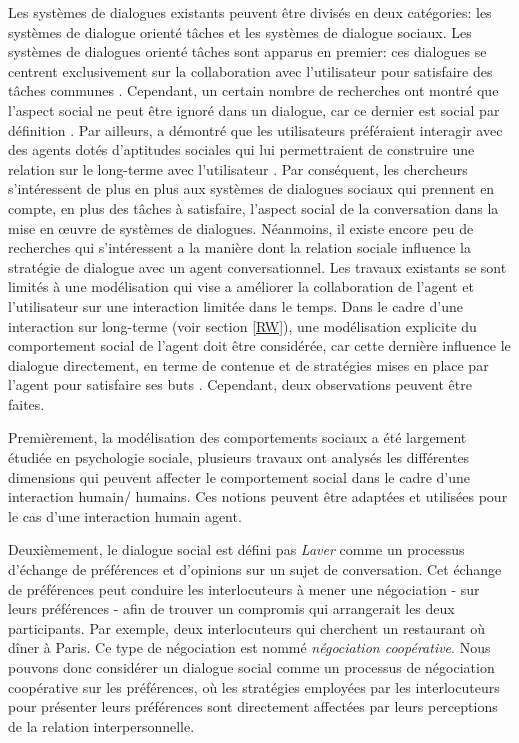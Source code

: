 \documentclass [french]{sig-alternate-05-2015}
\begin{document}
Les systèmes de dialogues existants peuvent être divisés en deux catégories: les systèmes de dialogue orienté tâches et les systèmes de dialogue sociaux. Les systèmes de dialogues orienté tâches sont apparus en premier: ces dialogues se centrent exclusivement sur la collaboration avec l'utilisateur pour satisfaire des tâches communes \cite{allen1995spoken, allen1996robust}. Cependant, un certain nombre de recherches ont montré que l'aspect social ne peut être ignoré dans un dialogue, car ce dernier est social par définition \cite{markopoulos2005case}. Par ailleurs, \cite{moon1998intimate} a démontré que les utilisateurs préféraient interagir avec des agents dotés d'aptitudes sociales qui lui permettraient de construire une relation sur le long-terme avec l'utilisateur \cite{bickmore2005establishing}. Par conséquent, les chercheurs s'intéressent de plus en plus aux systèmes de dialogues sociaux qui prennent en compte, en plus des tâches à satisfaire, l'aspect social de la conversation dans la mise en œuvre de systèmes de dialogues. Néanmoins, il existe encore peu de recherches qui s'intéressent a la manière dont la relation sociale influence la stratégie de dialogue avec un agent conversationnel. Les travaux existants \cite{ref} se sont limités à une modélisation qui vise a améliorer la collaboration de l'agent et l'utilisateur sur une interaction limitée dans le temps. Dans le cadre d'une interaction sur long-terme (voir section \ref{RW}), une modélisation explicite du comportement social de l'agent doit être considérée, car cette dernière influence le dialogue directement, en terme de contenue et de stratégies mises en place par l'agent pour satisfaire ses buts \cite{bickmore2012empirical}. Cependant, deux observations peuvent être faites.

\par Premièrement, la modélisation des comportements sociaux a été largement étudiée en psychologie sociale, plusieurs travaux ont analysés les différentes dimensions qui peuvent affecter le comportement social dans le cadre d'une interaction humain/ humains. Ces notions peuvent être adaptées et utilisées pour le cas d'une interaction humain agent.

 \par Deuxièmement, le dialogue social est défini pas \emph{Laver}\cite{laver1981linguistic} comme un processus d'échange de préférences et d'opinions sur un sujet de conversation. Cet échange de préférences peut conduire les interlocuteurs à mener une négociation - sur leurs préférences - afin de trouver un compromis qui arrangerait les deux participants. Par exemple, deux interlocuteurs qui cherchent un restaurant où dîner à Paris. Ce type de négociation est nommé \emph{négociation coopérative}. Nous pouvons donc considérer un dialogue social comme un processus de négociation coopérative sur les préférences, où les stratégies employées par les interlocuteurs pour présenter leurs préférences sont directement affectées par leurs perceptions de la relation interpersonnelle.
\end{document}
